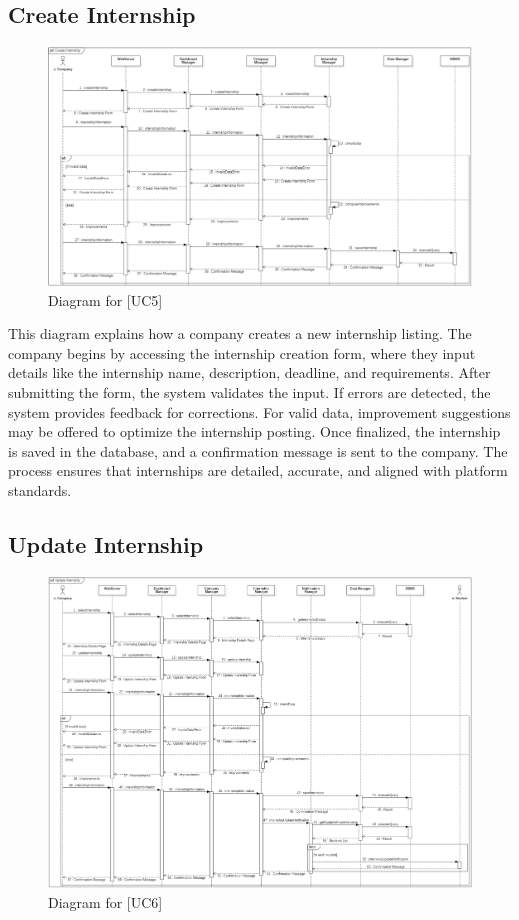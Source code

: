 \subsection{Create Internship}
\begin{figure} [H]
    \centering
    \includegraphics[width=1\linewidth]{DD/Images/Runtime Sequence Diagram Images/create_internship.png}
    \caption{Diagram for [UC5]}
    \label{fig: Create Internship Diagram}
\end{figure}
This diagram explains how a company creates a new internship listing. The company begins by accessing the internship creation form, where they input details like the internship name, description, deadline, and requirements. After submitting the form, the system validates the input. If errors are detected, the system provides feedback for corrections. For valid data, improvement suggestions may be offered to optimize the internship posting. Once finalized, the internship is saved in the database, and a confirmation message is sent to the company. The process ensures that internships are detailed, accurate, and aligned with platform standards.

\subsection{Update Internship}
\begin{figure} [H]
    \centering
    \includegraphics[width=1\linewidth]{DD/Images/Runtime Sequence Diagram Images/update_internship.png}
    \caption{Diagram for [UC6]}
    \label{fig: Update Internship Diagram}
\end{figure}

